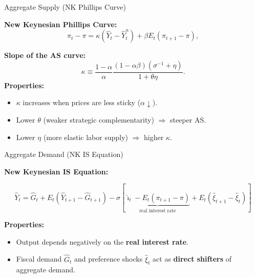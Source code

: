 \documentclass[11pt,aspectratio=169]{beamer}
\begin{document}
\begin{frame}{Aggregate Supply (NK Phillips Curve)}
\small

\textbf{New Keynesian Phillips Curve:}
\begin{equation}
\pi_t - \pi
=
\kappa(\hat{Y}_t - \hat{Y}_t^{n})
+
\beta E_t(\pi_{t+1}-\pi),
\label{AS}
\end{equation}

\textbf{Slope of the AS curve:}
\begin{equation}
\kappa \equiv
\frac{1-\alpha}{\alpha}
\frac{(1-\alpha\beta)(\sigma^{-1}+\eta)}{1+\theta\eta}.
\label{Kdef}
\end{equation}
\textbf{Properties:}
\begin{itemize}
    \item $\kappa$ increases when prices are less sticky ($\alpha \downarrow$).
    \item Lower $\theta$ (weaker strategic complementarity) $\Rightarrow$ steeper AS.
    \item Lower $\eta$ (more elastic labor supply) $\Rightarrow$ higher $\kappa$.
   \end{itemize}

\end{frame}

\begin{frame}{Aggregate Demand (NK IS Equation)}
\small

\textbf{New Keynesian IS Equation:}

\begin{equation}
\hat{Y}_t =
\hat{G}_t +
E_t(\hat{Y}_{t+1}-\hat{G}_{t+1})
-
\sigma\!\left[
\underbrace{\hat{\imath}_t - E_t(\pi_{t+1}-\pi)}_{\text{real interest rate}}
+
E_t(\hat{\xi}_{t+1}-\hat{\xi}_t)
\right]
\label{ADequation}
\end{equation}

\vspace{0.3cm}
\textbf{Properties:}
\begin{itemize}
    \item Output depends negatively on the \textbf{real interest rate}.
    \item Fiscal demand $\hat{G}_t$ and preference shocks $\hat{\xi}_t$
          act as \textbf{direct shifters} of aggregate demand.
\end{itemize}

\end{frame}
\end{document}
